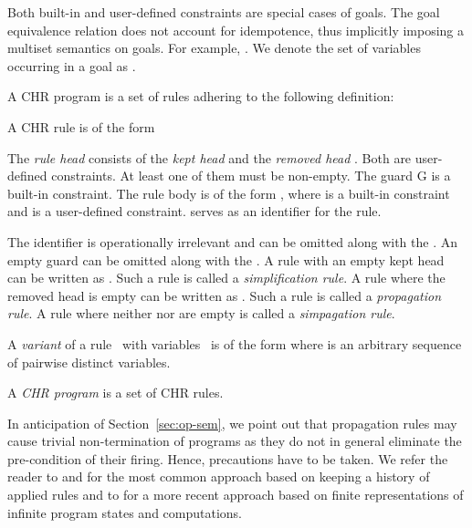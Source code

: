 \documentclass[acmtocl]{acmtrans2m}
\begin{document}
Both built-in and user-defined constraints are special cases of goals. The goal
equivalence relation  does not account for idempotence, thus
implicitly imposing a multiset semantics on goals. For example,
. We denote the set of variables occurring in a
goal  as .

A CHR program is a set of rules adhering to the following definition:

\begin{definition} \label{def:chr_rule}
\begin{longenum}
\item A CHR rule is of
the form

The \emph{rule head}  consists of the \emph{kept head} 
and the \emph{removed head} . Both  are user-defined constraints.
At least one of them must be non-empty. The guard G is a built-in constraint.
The rule body is of the form , where  is a built-in
constraint and  is a user-defined constraint.  serves as an identifier
for the rule.

\item The identifier  is operationally irrelevant and can be omitted along
with the . An empty guard  can be omitted along with the . A
rule with an empty kept head  can be written as . Such a rule is called a \emph{simplification rule}. A
rule where the removed head  is empty can be written as . Such a rule is called a \emph{propagation
rule}. A rule where neither  nor  are empty is called a
\emph{simpagation rule}.

\item A \emph{variant} of a rule~ with variables~ is of the form  where  is an
arbitrary sequence of pairwise distinct variables.

\item A \emph{CHR program} is a set of CHR rules.
\end{longenum}
\end{definition}

In anticipation of Section~\ref{sec:op-sem}, we point out that propagation rules
may cause trivial non-termination of programs as they do not in general
eliminate the pre-condition of their firing. Hence, precautions have to be
taken. We refer the reader to  and
 for the most common approach based on keeping a
history of applied rules and to  for a
more recent approach based on finite representations of infinite program states and computations.
\end{document}
